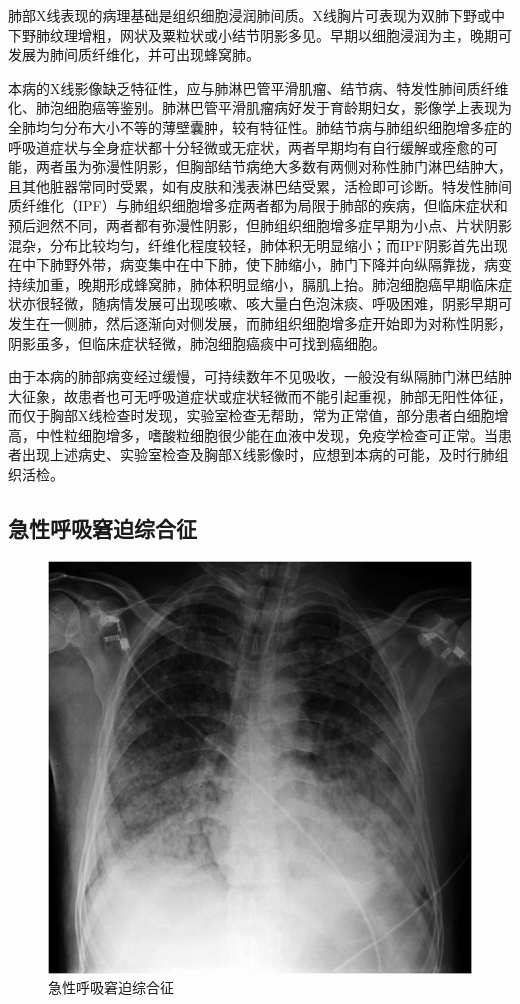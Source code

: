 肺部X线表现的病理基础是组织细胞浸润肺间质。X线胸片可表现为双肺下野或中下野肺纹理增粗，网状及粟粒状或小结节阴影多见。早期以细胞浸润为主，晚期可发展为肺间质纤维化，并可出现蜂窝肺。

本病的X线影像缺乏特征性，应与肺淋巴管平滑肌瘤、结节病、特发性肺间质纤维化、肺泡细胞癌等鉴别。肺淋巴管平滑肌瘤病好发于育龄期妇女，影像学上表现为全肺均匀分布大小不等的薄壁囊肿，较有特征性。肺结节病与肺组织细胞增多症的呼吸道症状与全身症状都十分轻微或无症状，两者早期均有自行缓解或痊愈的可能，两者虽为弥漫性阴影，但胸部结节病绝大多数有两侧对称性肺门淋巴结肿大，且其他脏器常同时受累，如有皮肤和浅表淋巴结受累，活检即可诊断。特发性肺间质纤维化（IPF）与肺组织细胞增多症两者都为局限于肺部的疾病，但临床症状和预后迥然不同，两者都有弥漫性阴影，但肺组织细胞增多症早期为小点、片状阴影混杂，分布比较均匀，纤维化程度较轻，肺体积无明显缩小；而IPF阴影首先出现在中下肺野外带，病变集中在中下肺，使下肺缩小，肺门下降并向纵隔靠拢，病变持续加重，晚期形成蜂窝肺，肺体积明显缩小，膈肌上抬。肺泡细胞癌早期临床症状亦很轻微，随病情发展可出现咳嗽、咳大量白色泡沫痰、呼吸困难，阴影早期可发生在一侧肺，然后逐渐向对侧发展，而肺组织细胞增多症开始即为对称性阴影，阴影虽多，但临床症状轻微，肺泡细胞癌痰中可找到癌细胞。

由于本病的肺部病变经过缓慢，可持续数年不见吸收，一般没有纵隔肺门淋巴结肿大征象，故患者也可无呼吸道症状或症状轻微而不能引起重视，肺部无阳性体征，而仅于胸部X线检查时发现，实验室检查无帮助，常为正常值，部分患者白细胞增高，中性粒细胞增多，嗜酸粒细胞很少能在血液中发现，免疫学检查可正常。当患者出现上述病史、实验室检查及胸部X线影像时，应想到本病的可能，及时行肺组织活检。

\subsection{急性呼吸窘迫综合征}

\begin{figure}[!htbp]
 \centering
 \includegraphics{./images/Image00185.jpg}
 \captionsetup{justification=centering}
 \caption{急性呼吸窘迫综合征}
 \label{fig3-10-6}
  \end{figure} 

